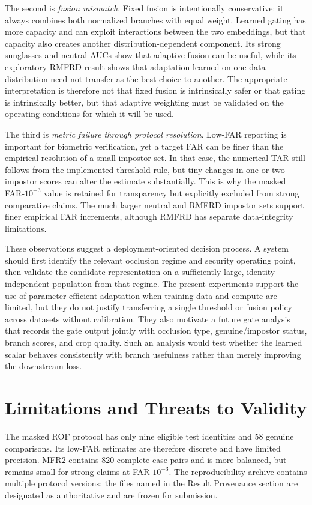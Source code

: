 ﻿\documentclass[10pt,journal,compsoc]{IEEEtran}
\begin{document}
The second is \emph{fusion mismatch}. Fixed fusion is intentionally conservative: it always combines both normalized branches with equal weight. Learned gating has more capacity and can exploit interactions between the two embeddings, but that capacity also creates another distribution-dependent component. Its strong sunglasses and neutral AUCs show that adaptive fusion can be useful, while its exploratory RMFRD result shows that adaptation learned on one data distribution need not transfer as the best choice to another. The appropriate interpretation is therefore not that fixed fusion is intrinsically safer or that gating is intrinsically better, but that adaptive weighting must be validated on the operating conditions for which it will be used.

The third is \emph{metric failure through protocol resolution}. Low-FAR reporting is important for biometric verification, yet a target FAR can be finer than the empirical resolution of a small impostor set. In that case, the numerical TAR still follows from the implemented threshold rule, but tiny changes in one or two impostor scores can alter the estimate substantially. This is why the masked FAR-$10^{-3}$ value is retained for transparency but explicitly excluded from strong comparative claims. The much larger neutral and RMFRD impostor sets support finer empirical FAR increments, although RMFRD has separate data-integrity limitations.

These observations suggest a deployment-oriented decision process. A system should first identify the relevant occlusion regime and security operating point, then validate the candidate representation on a sufficiently large, identity-independent population from that regime. The present experiments support the use of parameter-efficient adaptation when training data and compute are limited, but they do not justify transferring a single threshold or fusion policy across datasets without calibration. They also motivate a future gate analysis that records the gate output jointly with occlusion type, genuine/impostor status, branch scores, and crop quality. Such an analysis would test whether the learned scalar behaves consistently with branch usefulness rather than merely improving the downstream loss.

\section{Limitations and Threats to Validity}
The masked ROF protocol has only nine eligible test identities and 58 genuine comparisons. Its low-FAR estimates are therefore discrete and have limited precision. MFR2 contains 820 complete-case pairs and is more balanced, but remains small for strong claims at FAR $10^{-3}$. The reproducibility archive contains multiple protocol versions; the files named in the Result Provenance section are designated as authoritative and are frozen for submission.
\end{document}
